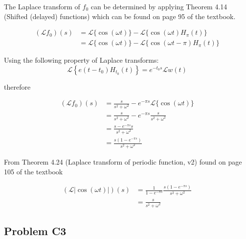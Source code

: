 \documentclass[a4paper,10pt,reqno]{amsart}
\numberwithin{equation}{section}
\newcommand{\lap}{\mathscr{L}}
\begin{document}
The Laplace transform of $f_0$ can be determined by applying Theorem 4.14 (Shifted (delayed) functions) which can be found on page 95 of the textbook.

\begin{align}
(\lap f_0)(s) &= \lap\{\cos(\omega t)\} - \lap\{\cos(\omega t)H_\pi(t)\} \\
&= \lap\{\cos(\omega t)\} - \lap\{\cos(\omega t - \pi)H_\pi(t)\}
\end{align}

Using the following property of Laplace transforms:
\begin{equation}
    \lap\left\{e(t - t_0)H_{t_0}(t)\right\} = e^{-t_0 s}\lap{w(t)}
\end{equation}

therefore

\begin{align}
     (\lap f_0)(s) &= \frac{s}{s^2 + \omega^2} - e^{-\pi s}\lap\{\cos(\omega t)\} \\
     &= \frac{s}{s^2 + \omega^2} - e^{-\pi s}\frac{s}{s^2 + \omega^2} \\
     &= \frac{s - e^{-\pi s}s}{s^2 + \omega^2} \\
     &= \frac{s(1 - e^{-\pi s})}{s^2 + \omega^2}
\end{align}

From Theorem 4.24 (Laplace transform of periodic function, v2) found on page 105 of the textbook

\begin{align}
(\lap|{\cos(\omega t)|})(s) &= \frac{1}{1 - e^{-\pi s}}\frac{s(1 - e^{-\pi s})}{s^2 + \omega^2} \\
&= \frac{s}{s^2 + \omega^2}
\end{align}


\subsection{Problem C3}\label{sec:c3}




\end{document}
